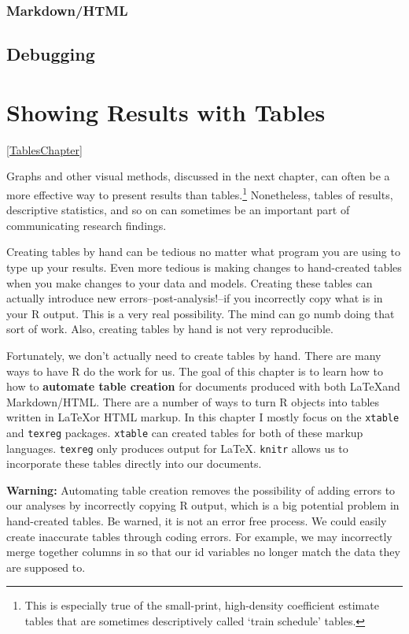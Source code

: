 \documentclass[ChapterTOCs,krantz1]{krantz}\usepackage{graphicx, color}
\begin{document}
\subsection{Markdown/HTML}

\section{Debugging}





\chapter{Showing Results with Tables}\ref{TablesChapter}

Graphs and other visual methods, discussed in the next chapter, can
often be a more effective way to present results than tables.\footnote{This
  is especially true of the small-print, high-density coefficient
  estimate tables that are sometimes descriptively called `train
  schedule' tables.} Nonetheless, tables of results, descriptive statistics,
and so on can sometimes be an important part of communicating
research findings.

Creating tables by hand can be tedious no matter what program you are
using to type up your results. Even more tedious is making changes to
hand-created tables when you make changes to your data and models.
Creating these tables can actually introduce new
errors--post-analysis!--if you incorrectly copy what is in your
R output. This is a very real possibility. The mind can go numb
doing that sort of work. Also, creating tables by hand is not very
reproducible.

Fortunately, we don't actually need to create tables by hand. There are
many ways to have R do the work for us. The goal of this
chapter is to learn how to how to \textbf{automate table creation} for
documents produced with both \LaTeX and Markdown/HTML. There are a
number of ways to turn R objects into tables written in
\LaTeX or HTML markup. In this chapter I mostly focus on the
\texttt{xtable} and \texttt{texreg} packages. \texttt{xtable} can
created tables for both of these markup languages. \texttt{texreg} only
produces output for \LaTeX. \texttt{knitr} allows us to incorporate
these tables directly into our documents.

\textbf{Warning:} Automating table creation removes the possibility of
adding errors to our analyses by incorrectly copying R output,
which is a big potential problem in hand-created tables. Be warned, it
is not an error free process. We could easily create inaccurate tables
through coding errors. For example, we may incorrectly merge together
columns in so that our id variables no longer match the data they are
supposed to.
\end{document}
